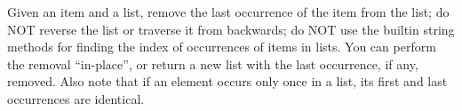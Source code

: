 \documentclass[11pt]{exam}
\begin{document}

\vspace{10pt}
\begin{center}
\end{center}
\vspace{10pt}

\begin{questions}

\question

Given an item and a list, remove the last occurrence of the item from the list; do NOT reverse the list or traverse it from backwards; do NOT use the builtin string methods for finding the index of occurrences of items in lists. You can perform the removal ``in-place'', or return a new list with the last occurrence, if any, removed. Also note that if an element occurs only once in a list, its first and last occurrences are identical.

 
\end{questions}
\end{document}
